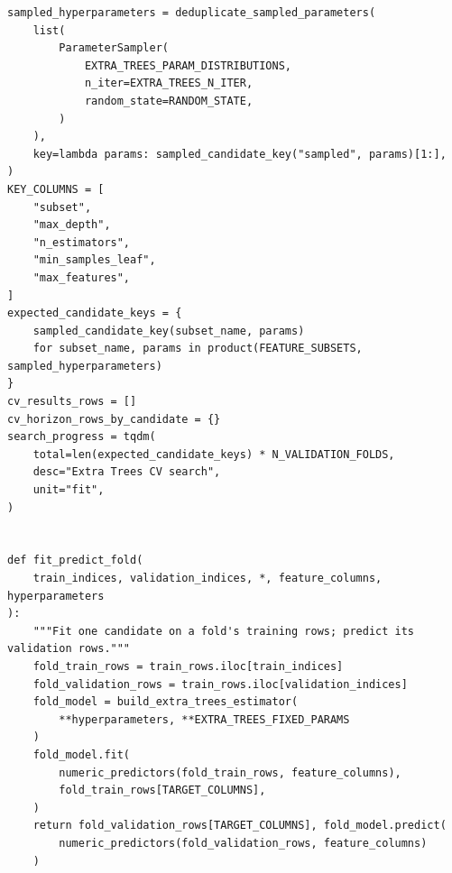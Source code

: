 \begin{verbatim}
sampled_hyperparameters = deduplicate_sampled_parameters(
    list(
        ParameterSampler(
            EXTRA_TREES_PARAM_DISTRIBUTIONS,
            n_iter=EXTRA_TREES_N_ITER,
            random_state=RANDOM_STATE,
        )
    ),
    key=lambda params: sampled_candidate_key("sampled", params)[1:],
)
KEY_COLUMNS = [
    "subset",
    "max_depth",
    "n_estimators",
    "min_samples_leaf",
    "max_features",
]
expected_candidate_keys = {
    sampled_candidate_key(subset_name, params)
    for subset_name, params in product(FEATURE_SUBSETS, sampled_hyperparameters)
}
cv_results_rows = []
cv_horizon_rows_by_candidate = {}
search_progress = tqdm(
    total=len(expected_candidate_keys) * N_VALIDATION_FOLDS,
    desc="Extra Trees CV search",
    unit="fit",
)


def fit_predict_fold(
    train_indices, validation_indices, *, feature_columns, hyperparameters
):
    """Fit one candidate on a fold's training rows; predict its validation rows."""
    fold_train_rows = train_rows.iloc[train_indices]
    fold_validation_rows = train_rows.iloc[validation_indices]
    fold_model = build_extra_trees_estimator(
        **hyperparameters, **EXTRA_TREES_FIXED_PARAMS
    )
    fold_model.fit(
        numeric_predictors(fold_train_rows, feature_columns),
        fold_train_rows[TARGET_COLUMNS],
    )
    return fold_validation_rows[TARGET_COLUMNS], fold_model.predict(
        numeric_predictors(fold_validation_rows, feature_columns)
    )



\end{verbatim}
